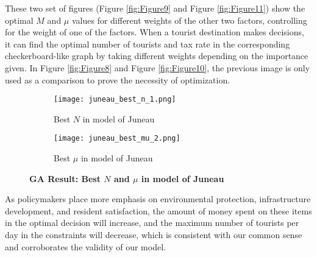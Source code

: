 \documentclass{mcmthesis}
\begin{document}
{These two set of figures (Figure \ref{fig:Figure9} and Figure \ref{fig:Figure11}) show the optimal $M$ and $\mu$ values for different weights of the other two factors, controlling for the weight of one of the factors. When a tourist destination makes decisions, it can find the optimal number of tourists and tax rate in the corresponding checkerboard-like graph by taking different weights depending on the importance given. In Figure \ref{fig:Figure8} and Figure \ref{fig:Figure10}, the previous image is only used as a comparison to prove the necessity of optimization.}

\begin{figure}[H]
  \centering
  \begin{subfigure}[b]{0.4\textwidth}
      \texttt{[image: juneau\_best\_n\_1.png]}
      \caption{Best $N$ in model of Juneau}
      \label{JNn}
  \end{subfigure}
  \hfill
  \begin{subfigure}[b]{0.4\textwidth}
      \texttt{[image: juneau\_best\_mu\_2.png]}
      \caption{Best $\mu$ in model of Juneau}
      \label{JNmu}
  \end{subfigure}
  \caption{\textbf{GA Result: Best $N$ and $\mu$ in model of Juneau}}
  \label{fig:JNnmu}
\end{figure}

{As policymakers place more emphasis on environmental protection, infrastructure development, and resident satisfaction, the amount of money spent on these items in the optimal decision will increase, and the maximum number of tourists per day in the constraints will decrease, which is consistent with our common sense and corroborates the validity of our model.}
\end{document}
